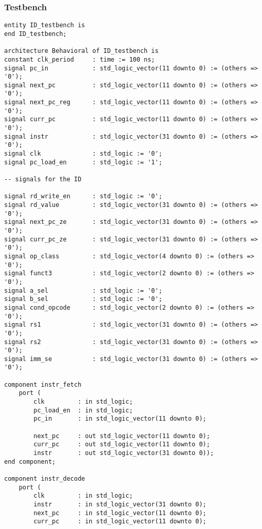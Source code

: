 \subsubsection{Testbench}
\begin{code}
\label{code:ID_TB}  
\begin{verbatim}
entity ID_testbench is
end ID_testbench;

architecture Behavioral of ID_testbench is
constant clk_period     : time := 100 ns;
signal pc_in            : std_logic_vector(11 downto 0) := (others => '0');
signal next_pc          : std_logic_vector(11 downto 0) := (others => '0');
signal next_pc_reg      : std_logic_vector(11 downto 0) := (others => '0');
signal curr_pc          : std_logic_vector(11 downto 0) := (others => '0');
signal instr            : std_logic_vector(31 downto 0) := (others => '0');
signal clk              : std_logic := '0';
signal pc_load_en       : std_logic := '1';

-- signals for the ID

signal rd_write_en      : std_logic := '0';
signal rd_value         : std_logic_vector(31 downto 0) := (others => '0');
signal next_pc_ze       : std_logic_vector(31 downto 0) := (others => '0');
signal curr_pc_ze       : std_logic_vector(31 downto 0) := (others => '0');
signal op_class         : std_logic_vector(4 downto 0) := (others => '0');
signal funct3           : std_logic_vector(2 downto 0) := (others => '0');
signal a_sel            : std_logic := '0';
signal b_sel            : std_logic := '0';
signal cond_opcode      : std_logic_vector(2 downto 0) := (others => '0');
signal rs1              : std_logic_vector(31 downto 0) := (others => '0');
signal rs2              : std_logic_vector(31 downto 0) := (others => '0');
signal imm_se           : std_logic_vector(31 downto 0) := (others => '0');
        
component instr_fetch
    port ( 
        clk         : in std_logic;
        pc_load_en  : in std_logic;
        pc_in       : in std_logic_vector(11 downto 0);
        
        next_pc     : out std_logic_vector(11 downto 0);
        curr_pc     : out std_logic_vector(11 downto 0);
        instr       : out std_logic_vector(31 downto 0));
end component;

component instr_decode
    port (
        clk         : in std_logic;
        instr       : in std_logic_vector(31 downto 0);
        next_pc     : in std_logic_vector(11 downto 0);
        curr_pc     : in std_logic_vector(11 downto 0);
        

\end{verbatim}
\end{code}
